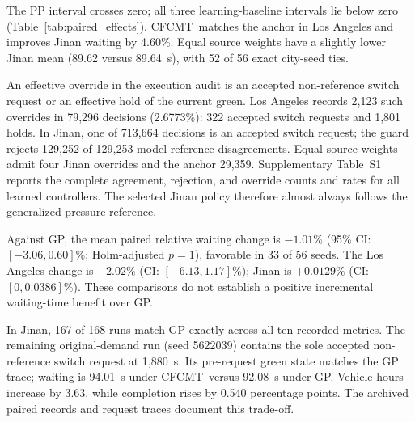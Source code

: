 \documentclass[letterpaper,journal]{IEEEtran}
\newcommand{\method}{CFCMT}
\begin{document}
The PP interval crosses zero; all three learning-baseline intervals lie below zero (Table~\ref{tab:paired_effects}). \method\ matches the anchor in Los Angeles and improves Jinan waiting by 4.60\%. Equal source weights have a slightly lower Jinan mean (89.62 versus 89.64~s), with 52 of 56 exact city-seed ties.

An effective override in the execution audit is an accepted non-reference switch request or an effective hold of the current green. Los Angeles records 2,123 such overrides in 79,296 decisions (2.6773\%): 322 accepted switch requests and 1,801 holds. In Jinan, one of 713,664 decisions is an accepted switch request; the guard rejects 129,252 of 129,253 model-reference disagreements. Equal source weights admit four Jinan overrides and the anchor 29,359. Supplementary Table~S1 reports the complete agreement, rejection, and override counts and rates for all learned controllers. The selected Jinan policy therefore almost always follows the generalized-pressure reference.

Against GP, the mean paired relative waiting change is $-1.01\%$ (95\% CI: $[-3.06,0.60]\%$; Holm-adjusted $p=1$), favorable in 33 of 56 seeds. The Los Angeles change is $-2.02\%$ (CI: $[-6.13,1.17]\%$); Jinan is $+0.0129\%$ (CI: $[0,0.0386]\%$). These comparisons do not establish a positive incremental waiting-time benefit over GP.

In Jinan, 167 of 168 runs match GP exactly across all ten recorded metrics. The remaining original-demand run (seed 5622039) contains the sole accepted non-reference switch request at 1,880~s. Its pre-request green state matches the GP trace; waiting is 94.01~s under \method\ versus 92.08~s under GP. Vehicle-hours increase by 3.63, while completion rises by 0.540 percentage points. The archived paired records and request traces document this trade-off.
\end{document}
